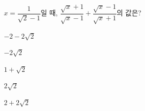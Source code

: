 \hspace*{2mm}\begin{minipage}[t]{\dimexpr\linewidth-2mm\relax}\vspace{0pt}
$x=\dfrac{1}{\sqrt{2}-1}$일 때, $\dfrac{\sqrt{x}+1}{\sqrt{x}-1}+\dfrac{\sqrt{x}-1}{\sqrt{x}+1}$의 값은?
\begin{choices32}{\rule[-3ex]{0pt}{8ex}$-2-2\sqrt{2}$}{\rule[-3ex]{0pt}{8ex}$-2\sqrt{2}$}{\rule[-3ex]{0pt}{8ex}$1+\sqrt{2}$}{\rule[-3ex]{0pt}{8ex}$2\sqrt{2}$}{\rule[-3ex]{0pt}{8ex}$2+2\sqrt{2}$}\end{choices32}\end{minipage}

